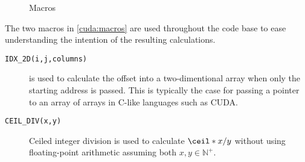 \begin{figure}[H]
    \centering
    \caption{Macros}
    \label{cuda:macros}
\end{figure}

The two macros in \autoref{cuda:macros} are used throughout the code base to
ease understanding the intention of the resulting calculations.

\begin{description}

    \item[\texttt{IDX\_2D(i,j,columns)}] is used to calculate the
        offset into a two-dimentional array when only the starting address is
        passed. This is typically the case for passing a pointer to an array of
        arrays in C-like languages such as CUDA.

    \item[\texttt{CEIL\_DIV(x,y)}] Ceiled integer division is used to calculate
        \(\ceil*{x/y}\) without using floating-point arithmetic assuming both
        \(x, y \in \mathbb{N}^{+} \).

\end{description}



